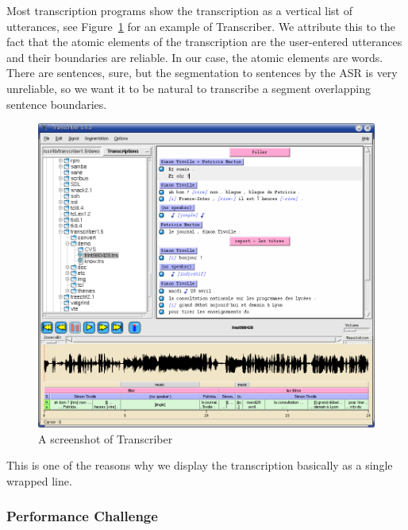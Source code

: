 \documentclass{svproc}
\begin{document}
Most transcription programs show the transcription as a vertical list of
utterances, see Figure~\ref{fig:transcriber1} for an example of
Transcriber. We attribute this to the fact that the atomic elements of
the transcription are the user-entered utterances and their boundaries are
reliable. In our case, the atomic elements are words. There are sentences, sure,
but the segmentation to sentences by the ASR is very unreliable, so we want it
to be natural to transcribe a segment overlapping sentence boundaries.

\begin{figure}[htpb]
\includegraphics[scale=0.4]{rc/transcriber1.png}
\caption{A screenshot of Transcriber}
\label{fig:transcriber1}
\end{figure}

This is one of the reasons why we display the transcription basically as a
single wrapped line.

\subsubsection{Performance Challenge}
\end{document}
